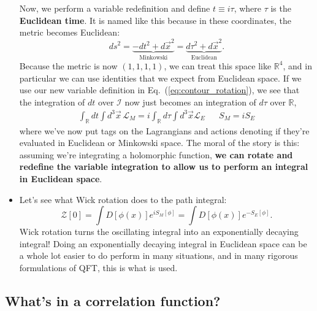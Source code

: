 \documentclass[12pt, oneside]{article}   	%
\theoremstyle{definition}
\begin{document}
\begin{itemize}
	Now, we perform a variable redefinition and define $t\equiv i\tau$, where $\tau$ is the \textbf{Euclidean time}. It is named like this because in these coordinates, the metric becomes Euclidean:
	\begin{equation}
		ds^2 = \underbrace{ -dt^2 + d\vec x^2 }_{\mathrm{Minkowski}} = \underbrace{ d\tau^2 + d\vec x^2 }_{\mathrm{Euclidean}}.
	\end{equation}
	Because the metric is now $(1, 1, 1, 1)$, we can treat this space like $\mathbb R^4$, and in particular we can use identities that we expect from Euclidean space. If we use our new variable definition in Eq.~(\ref{eq:contour_rotation}), we see that the integration of $dt$ over $\mathcal I$ now just becomes an integration of $d\tau$ over $\mathbb R$, 
	\begin{align}
		\int_{\mathbb R} dt \int d^3\vec x \, \mathcal L_M = i \int_{\mathbb R} d\tau \int d^3\vec x \mathcal L_E && S_M = i S_E
	\end{align}
	where we've now put tags on the Lagrangians and actions denoting if they're evaluated in Euclidean or Minkowski space. The moral of the story is this: assuming we're integrating a holomorphic function, \textbf{we can rotate and redefine the variable integration to allow us to perform an integral in Euclidean space}. 
	
	\item Let's see what Wick rotation does to the path integral:
	\begin{equation}
		\mathcal Z[0] = \int D[\phi(x)] e^{ i S_M[\phi]} = \int D[\phi(x)]  e^{ -S_E[\phi]}.
	\end{equation}
	Wick rotation turns the oscillating integral into an exponentially decaying integral! Doing an exponentially decaying integral in Euclidean space can be a whole lot easier to do perform in many situations, and in many rigorous formulations of QFT, this is what is used. 
	
\end{itemize}

\subsection*{What's in a correlation function?}
\end{document}
